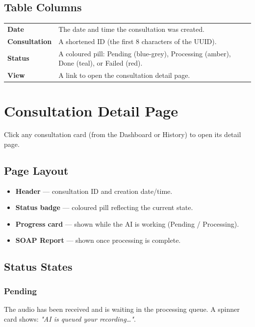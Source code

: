 \documentclass[12pt,a4paper]{article}
\begin{document}
\subsection{Table Columns}
\begin{tabular}{m{3cm}m{9cm}}
	\textbf{Date}         & The date and time the consultation was created.                                         \\
	\textbf{Consultation} & A shortened ID (the first 8 characters of the UUID).                                    \\
	\textbf{Status}       & A coloured pill: Pending (blue-grey), Processing (amber), Done (teal), or Failed (red). \\
	\textbf{View}         & A link to open the consultation detail page.                                            \\
\end{tabular}

\section{Consultation Detail Page}

Click any consultation card (from the Dashboard or History) to open its detail page.

\subsection{Page Layout}
\begin{itemize}
	\item \textbf{Header} — consultation ID and creation date/time.
	\item \textbf{Status badge} — coloured pill reflecting the current state.
	\item \textbf{Progress card} — shown while the AI is working (Pending / Processing).
	\item \textbf{SOAP Report} — shown once processing is complete.
\end{itemize}

\subsection{Status States}

\subsubsection{Pending}
The audio has been received and is waiting in the processing queue.
A spinner card shows: \textit{"AI is queued your recording…"}.
\end{document}
